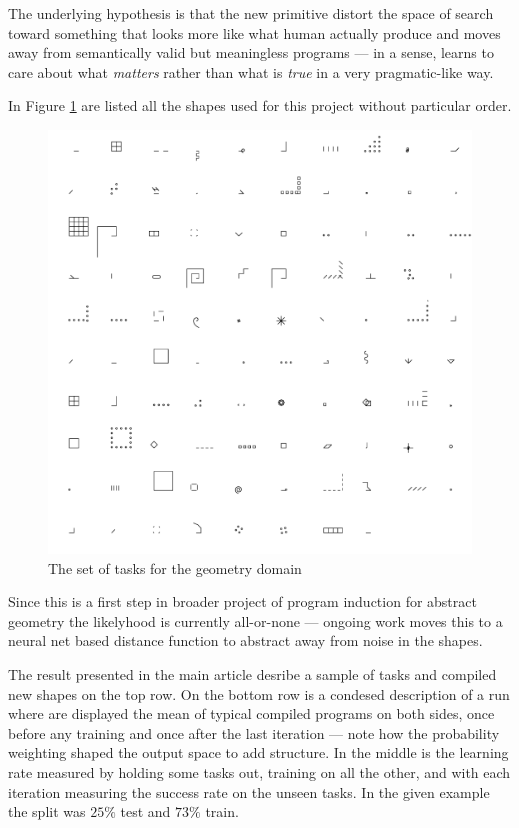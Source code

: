 \documentclass{article}
\begin{document}
The underlying hypothesis is that the new primitive distort the space of search
toward something that looks more like what human actually produce and moves away
from semantically valid but meaningless programs --- in a sense, learns to care
about what \emph{matters} rather than what is \emph{true} in a very
pragmatic-like way.

In Figure \ref{alltasksgeom} are listed all the shapes used for this project
without particular order.

\begin{figure}[htp]
\centering
\includegraphics[width = \textwidth]{figures/geomAllTasks.png}
\caption{The set of tasks for the geometry domain}
\label{alltasksgeom}
\end{figure}

Since this is a first step in broader project of program induction for abstract
geometry the likelyhood is currently all-or-none --- ongoing work moves this to
a neural net based distance function to abstract away from noise in the shapes.

The result presented in the main article desribe a sample of tasks and compiled
new shapes on the top row. On the bottom row is a condesed description of a run
where are displayed the mean of typical compiled programs on both sides, once
before any training and once after the last iteration --- note how the
probability weighting shaped the output space to add structure. In the middle is
the learning rate measured by holding some tasks out, training on all the other,
and with each iteration measuring the success rate on the unseen tasks. In the
given example the split was $25\%$ test and $73\%$ train.
\end{document}
